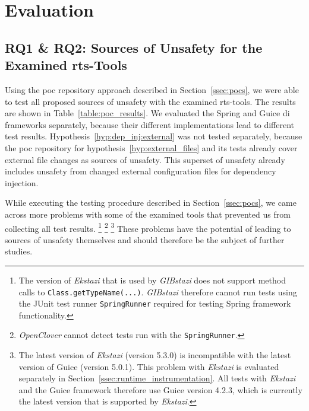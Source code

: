 \section{Evaluation}\label{sec:evaluation}


\subsection{RQ1 \& RQ2: Sources of Unsafety for the Examined \ac{rts}-Tools}
Using the \ac{poc} repository approach described in Section~\ref{ssec:pocs}, we were able to
test all proposed sources of unsafety with the examined \ac{rts}-tools. The results are shown in
Table~\ref{table:poc_results}. We evaluated the Spring and Guice \ac{di} frameworks separately,
because their different implementations lead to different test results.
Hypothesis~\ref{hyp:dep_inj:external} was not tested separately, because the \ac{poc} repository for
hypothesis~\ref{hyp:external_files} and its tests already cover external file changes as sources of
unsafety. This superset of unsafety already includes unsafety from changed external configuration
files for dependency injection.

While executing the testing procedure described in Section~\ref{ssec:pocs}, we came across
more problems with some of the examined tools that prevented us from collecting all test results.
\footnote{The version of \emph{Ekstazi} that is used by \emph{GIBstazi} does not support method
calls to \texttt{Class.getTypeName(...)}. \emph{GIBstazi} therefore cannot run tests using the
JUnit test runner \texttt{SpringRunner} required for testing Spring framework
functionality.\label{foot:**}}
\footnote{\emph{OpenClover} cannot detect tests run with the \texttt{SpringRunner}.\label{foot:***}}
\footnote{The latest version of \emph{Ekstazi} (version 5.3.0) is incompatible with the latest
version of Guice (version 5.0.1). This problem with \emph{Ekstazi} is evaluated separately in
Section~\ref{ssec:runtime_instrumentation}. All tests with \emph{Ekstazi} and the Guice framework
therefore use Guice version 4.2.3, which is currently the latest version that is supported by
\emph{Ekstazi}.\label{foot:****}}
These problems
have the potential of leading to sources of unsafety themselves and should therefore be the subject
of further studies.

